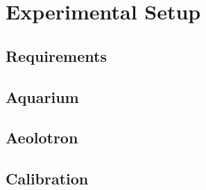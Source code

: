 \chapter{Experimental Setup}\label{experimental_setup}
	\section{Requirements}
	\section{Aquarium}
	\section{Aeolotron}
	\section{Calibration}